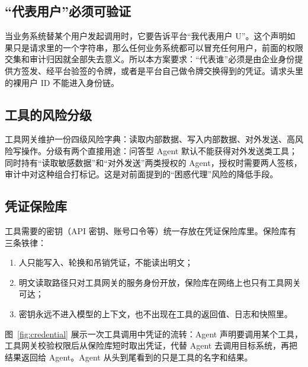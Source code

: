 \subsection{“代表用户”必须可验证}

当业务系统替某个用户发起调用时，它要告诉平台“我代表用户 U”。这个声明如果只是请求里的一个字符串，那么任何业务系统都可以冒充任何用户，前面的权限交集和审计归因就全部失去意义。所以本方案要求：“代表谁”必须是由企业身份提供方签发、经平台验签的令牌，或者是平台自己做令牌交换得到的凭证。请求头里的裸用户 ID 不能进入身份链。

\subsection{工具的风险分级}

工具网关维护一份四级风险字典：读取内部数据、写入内部数据、对外发送、高风险写操作。分级有两个直接用途：问答型 Agent 默认不能获得对外发送类工具；同时持有“读取敏感数据”和“对外发送”两类授权的 Agent，授权时需要两人签核，审计中对这种组合打标记。这是对前面提到的“困惑代理”风险的降低手段。

\subsection{凭证保险库}

工具需要的密钥（API 密钥、账号口令等）统一存放在凭证保险库里。保险库有三条铁律：

\begin{enumerate}
  \item 人只能写入、轮换和吊销凭证，不能读出明文；
  \item 明文读取路径只对工具网关的服务身份开放，保险库在网络上也只有工具网关可达；
  \item 密钥永远不进入模型的上下文，也不出现在工具的返回值、日志和快照里。
\end{enumerate}

图~\ref{fig:credential} 展示一次工具调用中凭证的流转：Agent 声明要调用某个工具，工具网关校验权限后从保险库短时取出凭证，代替 Agent 去调用目标系统，再把结果返回给 Agent。Agent 从头到尾看到的只是工具的名字和结果。

